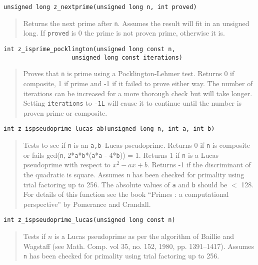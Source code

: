 \documentclass[a4paper,10pt]{article}
\newcommand{\code}{\lstinline}
\begin{document}
\begin{lstlisting}
unsigned long z_nextprime(unsigned long n, int proved)
\end{lstlisting}
\begin{quote}
Returns the next prime after \code{n}.  Assumes the result will fit in an unsigned long.  If \code{proved} is 0 the prime is not proven prime, otherwise it is.
\end{quote}

\begin{lstlisting}
int z_isprime_pocklington(unsigned long const n,
                   unsigned long const iterations)
\end{lstlisting}
\begin{quote}
Proves that \code{n} is prime using a Pocklington-Lehmer test. Returns 0 if composite, 1 if prime and -1 if it failed to prove either way. The number of iterations can be increased for a more thorough check but will take longer. Setting \code{iterations} to \code{-1L} will cause it to continue until the number is proven prime or composite.
\end{quote}

\begin{lstlisting}
int z_ispseudoprime_lucas_ab(unsigned long n, int a, int b)
\end{lstlisting}
\begin{quote}
Tests to see if \code{n} is an \code{a,b-}Lucas pseudoprime.  Returns 0 if \code{n} is composite or fails gcd(\code{n}, 2*\code{a}*\code{b}*(\code{a}*\code{a} - 4*\code{b})) = 1.  Returns 1 if \code{n} is a Lucas pseudoprime with respect to $x^2 - ax + b$.  Returns -1 if the discriminant of the quadratic is square.  Assumes \code{n} has been checked for primality using trial factoring up to 256.  The absolute values of \code{a} and \code{b} should be $<$ 128. For details of this function see the book ``Primes : a computational perspective'' by Pomerance and Crandall.
\end{quote}

\begin{lstlisting}
int z_ispseudoprime_lucas(unsigned long const n)
\end{lstlisting}
\begin{quote}
Tests if $n$ is a Lucas pseudoprime as per the algorithm of Baillie and Wagstaff (see Math. Comp. vol 35, no. 152, 1980, pp. 1391--1417).  Assumes \code{n} has been checked for primality using trial factoring up to 256. 
\end{quote}
\end{document}
